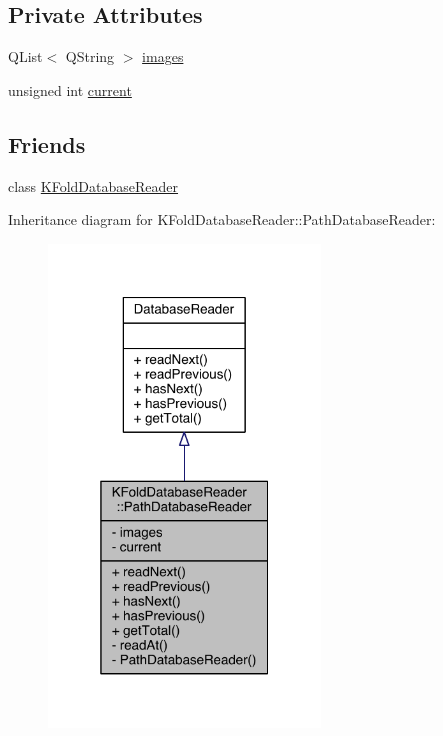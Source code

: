 \subsection*{Private Attributes}
\begin{DoxyCompactItemize}
\item 
Q\+List$<$ Q\+String $>$ \hyperlink{class_k_fold_database_reader_1_1_path_database_reader_a9b8942b3921fcc44a115fb1d4eb6b49c}{images}
\item 
unsigned int \hyperlink{class_k_fold_database_reader_1_1_path_database_reader_a2e6d3113ba8d5a4d1f48103a9219fcc7}{current}
\end{DoxyCompactItemize}
\subsection*{Friends}
\begin{DoxyCompactItemize}
\item 
class \hyperlink{class_k_fold_database_reader_1_1_path_database_reader_a7da6633b773512a4b2c2d543b8797b09}{K\+Fold\+Database\+Reader}
\end{DoxyCompactItemize}


Inheritance diagram for K\+Fold\+Database\+Reader\+:\+:Path\+Database\+Reader\+:\nopagebreak
\begin{figure}[H]
\begin{center}
\leavevmode
\includegraphics[width=205pt]{class_k_fold_database_reader_1_1_path_database_reader__inherit__graph}
\end{center}
\end{figure}



